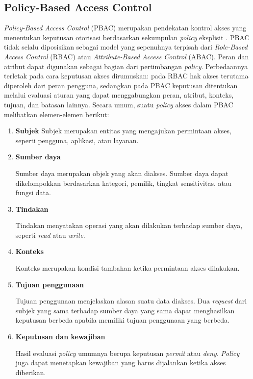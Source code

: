 \documentclass[bahasa, 12pt, a4paper, onecolumn, oneside, final]{report}
\begin{document}
\subsection{Policy-Based Access Control}
\label{subsec:policy-based-access-control}

\textit{Policy-Based Access Control} (PBAC) merupakan pendekatan kontrol akses yang menentukan keputusan otorisasi berdasarkan sekumpulan \textit{policy} eksplisit \autocite{ferraiolo2015policy}. PBAC tidak selalu diposisikan sebagai model yang sepenuhnya terpisah dari \textit{Role-Based Access Control} (RBAC) atau \textit{Attribute-Based Access Control} (ABAC). Peran dan atribut dapat digunakan sebagai bagian dari pertimbangan \textit{policy}. Perbedaannya terletak pada cara keputusan akses dirumuskan: pada RBAC hak akses terutama diperoleh dari peran pengguna, sedangkan pada PBAC keputusan ditentukan melalui evaluasi aturan yang dapat menggabungkan peran, atribut, konteks, tujuan, dan batasan lainnya. Secara umum, suatu \textit{policy} akses dalam PBAC melibatkan elemen-elemen berikut:

\begin{enumerate}
	\item \textbf{Subjek}
	      Subjek merupakan entitas yang mengajukan permintaan akses, seperti pengguna, aplikasi, atau layanan.

	\item \textbf{Sumber daya}

	      Sumber daya merupakan objek yang akan diakses. Sumber daya dapat dikelompokkan berdasarkan kategori, pemilik, tingkat sensitivitas, atau fungsi data.

	\item \textbf{Tindakan}

	      Tindakan menyatakan operasi yang akan dilakukan terhadap sumber daya, seperti \textit{read} atau \textit{write}.

	\item \textbf{Konteks}

	      Konteks merupakan kondisi tambahan ketika permintaan akses dilakukan.

	\item \textbf{Tujuan penggunaan}

	      Tujuan penggunaan menjelaskan alasan suatu data diakses. Dua \textit{request} dari subjek yang sama terhadap sumber daya yang sama dapat menghasilkan keputusan berbeda apabila memiliki tujuan penggunaan yang berbeda.

	\item \textbf{Keputusan dan kewajiban}

	      Hasil evaluasi \textit{policy} umumnya berupa keputusan \textit{permit} atau \textit{deny}. \textit{Policy} juga dapat menetapkan kewajiban yang harus dijalankan ketika akses diberikan.

\end{enumerate}
\end{document}

